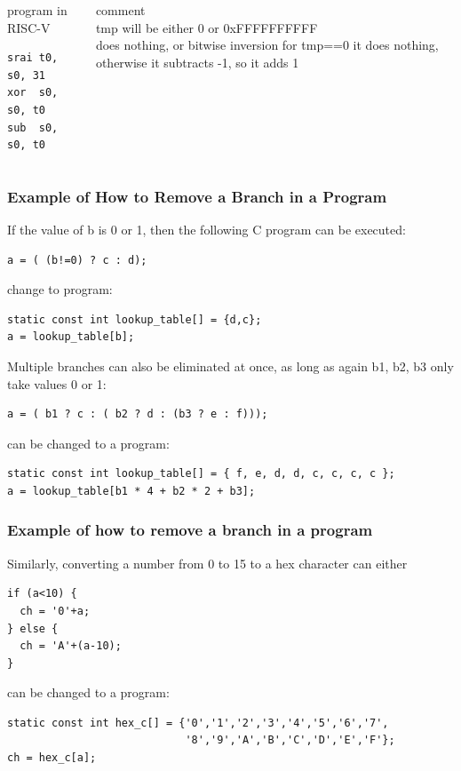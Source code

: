 \documentclass{beamer}
\begin{document}
\begin{frame}[fragile]
\begin{columns}[T]
\begin{column}{0.28\textwidth}
program in RISC-V
\begin{verbatim}
srai t0, s0, 31
xor  s0, s0, t0
sub  s0, s0, t0
\end{verbatim}
\end{column}
\begin{column}{0.45\textwidth}
\phantom{x}comment\\
\small
tmp will be either 0 or 0xFFFFFFFFFF\\
does nothing, or bitwise inversion
for tmp==0 it does nothing, otherwise it subtracts -1, so it adds 1
\end{column}
\end{columns}
\end{frame}

\begin{frame}[fragile]
\frametitle{Example of How to Remove a Branch in a Program}

If the value of b is 0 or 1, then the following C program can be executed:

\begin{verbatim}
a = ( (b!=0) ? c : d);
\end{verbatim}

change to program:

\begin{verbatim}
static const int lookup_table[] = {d,c};
a = lookup_table[b];
\end{verbatim}

\bigskip
Multiple branches can also be eliminated at once, as long as again b1, b2, b3 only take values 0 or 1:

\begin{verbatim}
a = ( b1 ? c : ( b2 ? d : (b3 ? e : f)));
\end{verbatim}

can be changed to a program:

\begin{verbatim}
static const int lookup_table[] = { f, e, d, d, c, c, c, c };
a = lookup_table[b1 * 4 + b2 * 2 + b3];
\end{verbatim}
\end{frame}

\begin{frame}[fragile]
\frametitle{Example of how to remove a branch in a program}

Similarly, converting a number from 0 to 15 to a hex character can either
\begin{verbatim}
if (a<10) {
  ch = '0'+a;
} else {
  ch = 'A'+(a-10);
}
\end{verbatim}

can be changed to a program:

\begin{verbatim}
static const int hex_c[] = {'0','1','2','3','4','5','6','7',
                            '8','9','A','B','C','D','E','F'};
ch = hex_c[a];
\end{verbatim}
\end{frame}
\end{document}
